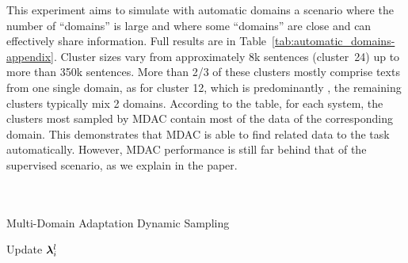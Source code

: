 This experiment aims to simulate with automatic domains a scenario where the number of ``domains'' is large and where some ``domains'' are close and can effectively share information. Full results are in Table~\ref{tab:automatic_domains-appendix}. Cluster sizes vary from approximately 8k sentences (cluster~24) up to more than 350k sentences. More than 2/3 of these clusters mostly comprise texts from one single domain, as for cluster 12, which is predominantly , the remaining clusters typically mix 2 domains. According to the table, for each system, the clusters most sampled by MDAC contain most of the data of the corresponding domain. This demonstrates that MDAC is able to find related data to the task automatically. However, MDAC performance is still far behind that of the supervised scenario, as we explain in the paper. 
\\
\\
\\

\begin{breakablealgorithm}
\caption{Multi-Domain Adaptation Dynamic Sampling} \label{alg:mdmt}
\begin{algorithmic}[1]
\REPEAT 
{}
\ENDIF
{}
	\STATE Update $\bm{\lambda}^l_i$
\ENDIF
{}
\ENDIF
{}
\end{algorithmic}
\end{breakablealgorithm}
